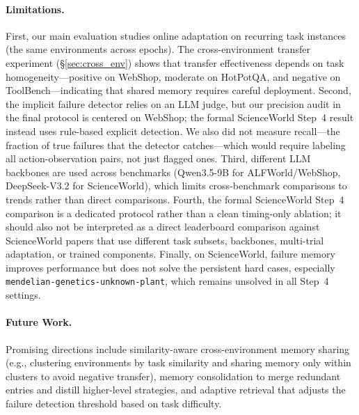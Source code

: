 \paragraph{Limitations.} First, our main evaluation studies online adaptation on recurring task instances (the same environments across epochs). The cross-environment transfer experiment (\S\ref{sec:cross_env}) shows that transfer effectiveness depends on task homogeneity---positive on WebShop, moderate on HotPotQA, and negative on ToolBench---indicating that shared memory requires careful deployment. Second, the implicit failure detector relies on an LLM judge, but our precision audit in the final protocol is centered on WebShop; the formal ScienceWorld Step~4 result instead uses rule-based explicit detection. We also did not measure recall---the fraction of true failures that the detector catches---which would require labeling all action-observation pairs, not just flagged ones. Third, different LLM backbones are used across benchmarks (Qwen3.5-9B for ALFWorld/WebShop, DeepSeek-V3.2 for ScienceWorld), which limits cross-benchmark comparisons to trends rather than direct comparisons. Fourth, the formal ScienceWorld Step~4 comparison is a dedicated protocol rather than a clean timing-only ablation; it should also not be interpreted as a direct leaderboard comparison against ScienceWorld papers that use different task subsets, backbones, multi-trial adaptation, or trained components. Finally, on ScienceWorld, failure memory improves performance but does not solve the persistent hard cases, especially \texttt{mendelian-genetics-unknown-plant}, which remains unsolved in all Step~4 settings.

\paragraph{Future Work.} Promising directions include similarity-aware cross-environment memory sharing (e.g., clustering environments by task similarity and sharing memory only within clusters to avoid negative transfer), memory consolidation to merge redundant entries and distill higher-level strategies, and adaptive retrieval that adjusts the failure detection threshold based on task difficulty.
